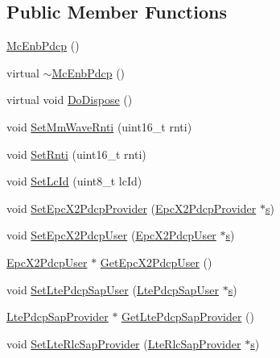 \subsection*{Public Member Functions}
\begin{DoxyCompactItemize}
\item 
\hyperlink{classns3_1_1McEnbPdcp_aadcd885059c27918c4d839bfc508ae6d}{Mc\+Enb\+Pdcp} ()
\item 
virtual \hyperlink{classns3_1_1McEnbPdcp_a4f4bf5dce0e50ec86ef3bd20ba913372}{$\sim$\+Mc\+Enb\+Pdcp} ()
\item 
virtual void \hyperlink{classns3_1_1McEnbPdcp_a1712fd3bc1ba741aec61321557a107eb}{Do\+Dispose} ()
\item 
void \hyperlink{classns3_1_1McEnbPdcp_adbdc096ae7129ca064fa850b19a45b0a}{Set\+Mm\+Wave\+Rnti} (uint16\+\_\+t rnti)
\item 
void \hyperlink{classns3_1_1McEnbPdcp_a936f062cf072c4269630af2bb44fddbd}{Set\+Rnti} (uint16\+\_\+t rnti)
\item 
void \hyperlink{classns3_1_1McEnbPdcp_a4e67a55f5eee6481c2136c1470faad32}{Set\+Lc\+Id} (uint8\+\_\+t lc\+Id)
\item 
void \hyperlink{classns3_1_1McEnbPdcp_a3ce8b8d74eae7de4fdd6972c13bfbd23}{Set\+Epc\+X2\+Pdcp\+Provider} (\hyperlink{classns3_1_1EpcX2PdcpProvider}{Epc\+X2\+Pdcp\+Provider} $\ast$\hyperlink{generate__test__data__lte__sinr_8m_ad83eeb3a142285d1243a08c6b7026df8}{s})
\item 
void \hyperlink{classns3_1_1McEnbPdcp_a2541812b36ef7673893bdb6c8e722cca}{Set\+Epc\+X2\+Pdcp\+User} (\hyperlink{classns3_1_1EpcX2PdcpUser}{Epc\+X2\+Pdcp\+User} $\ast$\hyperlink{generate__test__data__lte__sinr_8m_ad83eeb3a142285d1243a08c6b7026df8}{s})
\item 
\hyperlink{classns3_1_1EpcX2PdcpUser}{Epc\+X2\+Pdcp\+User} $\ast$ \hyperlink{classns3_1_1McEnbPdcp_ab4bd340a20513f8b42ffd2fa841e2e7c}{Get\+Epc\+X2\+Pdcp\+User} ()
\item 
void \hyperlink{classns3_1_1McEnbPdcp_af53ed8e018d0e9ea5512a735e27f7b94}{Set\+Lte\+Pdcp\+Sap\+User} (\hyperlink{classns3_1_1LtePdcpSapUser}{Lte\+Pdcp\+Sap\+User} $\ast$\hyperlink{generate__test__data__lte__sinr_8m_ad83eeb3a142285d1243a08c6b7026df8}{s})
\item 
\hyperlink{classns3_1_1LtePdcpSapProvider}{Lte\+Pdcp\+Sap\+Provider} $\ast$ \hyperlink{classns3_1_1McEnbPdcp_a68e9ed1433ec6005f3b897995783424e}{Get\+Lte\+Pdcp\+Sap\+Provider} ()
\item 
void \hyperlink{classns3_1_1McEnbPdcp_a74d6555aa75a55f4cbc77e09a0247776}{Set\+Lte\+Rlc\+Sap\+Provider} (\hyperlink{classns3_1_1LteRlcSapProvider}{Lte\+Rlc\+Sap\+Provider} $\ast$\hyperlink{generate__test__data__lte__sinr_8m_ad83eeb3a142285d1243a08c6b7026df8}{s})

\end{DoxyCompactItemize}

